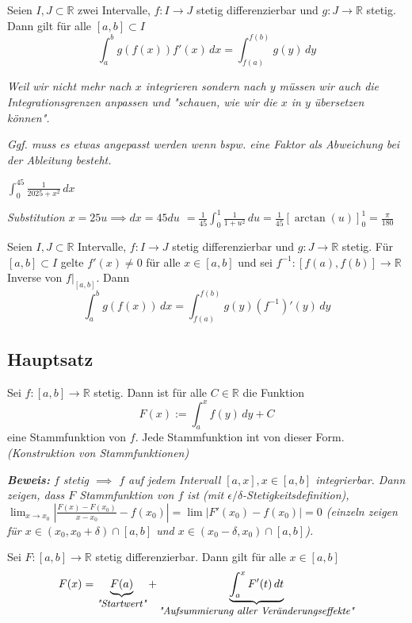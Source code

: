Seien $I,J \subset \mathbb{R}$ zwei Intervalle, $f : I \rightarrow J$ stetig differenzierbar und $g:J \rightarrow \mathbb{R}$ stetig. Dann gilt für alle $[a,b] \subset I$
$$\int_{a}^{b}g(f(x))f'(x)\,dx = \int_{f(a)}^{f(b)}g(y)\,dy$$

\textit{Weil wir nicht mehr nach $x$ integrieren sondern nach $y$ müssen wir auch die Integrationsgrenzen anpassen und "schauen, wie wir die $x$ in $y$ übersetzen können".}

\textit{Ggf. muss es etwas angepasst werden wenn bspw. eine Faktor als Abweichung bei der Ableitung besteht.}

\begin{exercise}
    $\int_{0}^{45}\frac{1}{2025+x^2}\,dx$

    \textit{Substitution $x=25u \implies dx = 45 du$
    $=\frac{1}{45}\int_{0}^{1}\frac{1}{1+u^2}\,du=\frac{1}{45}[\arctan(u)]^1_0=\frac{\pi}{180}$}
\end{exercise}

{\color{gray}
Seien $I,J \subset \mathbb{R}$ Intervalle, $f:I\rightarrow J$ stetig differenzierbar und $g:J \rightarrow \mathbb{R}$ stetig. 
Für $[a,b]\subset I$ gelte $f'(x)\neq 0$ für alle $x \in [a,b]$ und sei $f^{-1}:[f(a),f(b)]\rightarrow \mathbb{R}$ Inverse von $f|_{[a,b]}$. 
Dann
$$\int_{a}^{b} g(f(x))\,dx = \int_{f(a)}^{f(b)}g(y)(f^{-1})'(y)\,dy$$
}

\subsection{Hauptsatz}

Sei $f:[a,b]\rightarrow \mathbb{R}$ stetig. Dann ist für alle $C \in \mathbb{R}$ die Funktion $$F(x):=\int_{a}^{x}f(y)\,dy + C$$ eine Stammfunktion von $f$. Jede Stammfunktion int von dieser Form.
\textit{(Konstruktion von Stammfunktionen)}

\textit{
    \textbf{Beweis:} 
    $f$ stetig $\implies$ $f$ auf jedem Intervall $[a,x], x \in [a,b]$ integrierbar.
    Dann zeigen, dass $F$ Stammfunktion von $f$ ist (mit $\epsilon / \delta$-Stetigkeitsdefinition), $\lim_{x \rightarrow x_0} |\frac{F(x)-F(x_0)}{x-x_0} - f(x_0)|=\lim |F'(x_0)-f(x_0)|=0$ (einzeln zeigen für $x \in (x_0, x_0+ \delta) \cap [a,b]$ und $x \in (x_0-\delta, x_0) \cap [a,b]$).
}

Sei $F:[a,b]\rightarrow \mathbb{R}$ stetig differenzierbar. Dann gilt für alle $x \in [a,b]$
$$F(x)= \underbrace{F(a)}_{\textit{\small{"Startwert"}}} + \underbrace{\int_{a}^{x} F'(t) \, dt}_{\textit{\small{"Aufsummierung aller Veränderungseffekte"}}}$$


